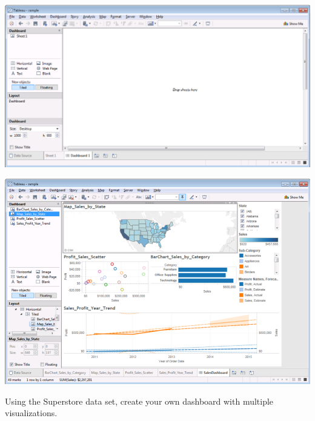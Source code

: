 \documentclass[xcolor=svgnames]{beamer} %
\begin{document}
\begin{frame}
\begin{center}
\includegraphics[width=.99\textwidth]{img/dashboard}
\end{center}
\end{frame}


\begin{frame}
\begin{center}
\includegraphics[width=.99\textwidth]{img/dw}
\end{center}
\end{frame}


\begin{frame}
\begin{example}
Using the Superstore data set, create your own dashboard with multiple visualizations.
\end{example}
\end{frame}
\end{document}
